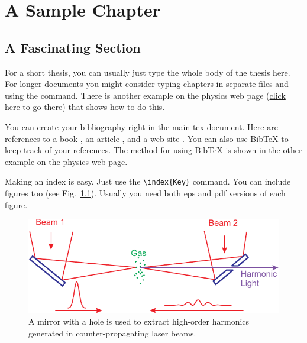 \documentclass[oneside, astronomy, noacknowlegments]{BYUPhys}
\begin{document}
 \frontmatter

 \makepreliminarypages

 \tableofcontents

 \mainmatter


\chapter{A Sample Chapter}

\section{A Fascinating Section}
\label{sec:meaningfulname}

For a short thesis, you can usually just type the whole body of the
thesis here.  For longer documents you might consider typing
chapters in separate files and using the \verb|| command.
There is another example on the physics web page
(\href{http://www.physics.byu.edu/undergraduate/latex.aspx}{click
here to go there}) that shows how to do this.

You can create your bibliography right in the main tex document.
Here are references to a book \cite{Jackson1998}, an article
\cite{Peatross2000}, and a web site \cite{intel}. You can also use
BibTeX to keep track of your references.  The method for using
BibTeX is shown in the other example on the physics web page.

Making an index is easy. Just use the \verb|\index{Key}| command.
 You can include figures too (see
Fig.~\ref{fig:MirrorDiagram}).  Usually you need both eps and pdf
versions of each figure.
\begin{figure}
    \centerline{\includegraphics{Graphic1}}
    \caption[Setup for using counter-propagating light]{\label{fig:MirrorDiagram}
    A mirror with a hole is used to extract high-order harmonics generated in
    counter-propagating laser beams.}
\end{figure}
\end{document}
